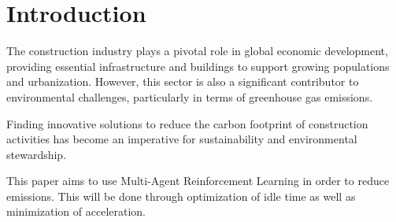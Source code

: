 \documentclass[conference]{IEEEtran}
\begin{document}
\section{Introduction}
The construction industry plays a pivotal role in global economic development,
providing essential infrastructure and buildings to support growing populations
and urbanization. However, this sector is also a significant contributor to
environmental challenges, particularly in terms of greenhouse gas emissions.

Finding innovative solutions to reduce the carbon footprint of construction
activities has become an imperative for sustainability and environmental stewardship.

\noindent
This paper aims to use Multi-Agent Reinforcement Learning in order to reduce emissions.
This will be done through optimization of idle time as well as minimization of
acceleration. 


{}

\end{document}
